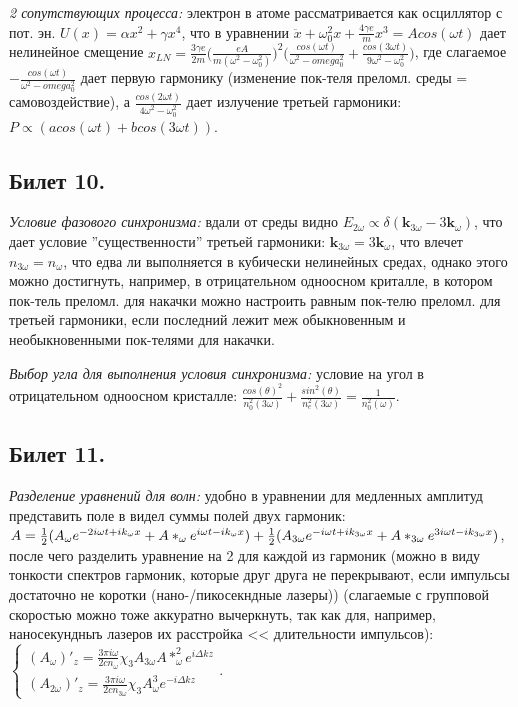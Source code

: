 \documentclass[a4paper,12pt]{article}
\theoremstyle{definition} %
\theoremstyle{definition} %
\theoremstyle{remark} %
\begin{document}
\textit{2 сопутствующих процесса:} электрон в атоме рассматривается как осциллятор с пот. эн. $U(x)=\alpha x^{2} + \gamma x^{4}$, что в уравнении $\ddot{x} + \omega_{0}^{2} x + \frac{4\gamma e}{m} x^{3} = Acos(\omega t)$ дает нелинейное смещение $x_{LN} = \frac{3\gamma e}{2m} \Big( \frac{eA}{m(\omega^{2}-\omega_{0}^{2})} \Big)^{2} \Big( \frac{cos(\omega t)}{\omega^{2}-omega_{0}^{2}} + \frac{cos(3\omega t)}{9\omega^{2}-\omega_{0}^{2}} \Big)$, где слагаемое $-\frac{cos(\omega t)}{\omega^{2}-omega_{0}^{2}}$ дает первую гармонику (изменение пок-теля преломл. среды = самовоздействие), а $\frac{cos(2\omega t)}{4\omega^{2}-\omega_{0}^{2}}$ дает излучение третьей гармоники: $P \propto (acos(\omega t)+bcos(3\omega t))$.


\subsection{Билет 10.}


\textit{Условие фазового синхронизма:} вдали от среды видно $E_{2\omega} \propto \delta(\mathbf{k}_{3\omega}-3\mathbf{k}_{\omega})$, что дает условие ''существенности'' третьей гармоники: $\mathbf{k}_{3\omega}=3\mathbf{k}_{\omega}$, что влечет $n_{3\omega}=n_{\omega}$, что едва ли выполняется в кубически нелинейных средах, однако этого можно достигнуть, например, в отрицательном одноосном криталле, в котором пок-тель преломл. для накачки можно настроить равным пок-телю преломл. для третьей гармоники, если последний лежит меж обыкновенным и необыкновенными пок-телями для накачки.


\textit{Выбор угла для выполнения условия синхронизма:} условие на угол в отрицательном одноосном кристалле: $\frac{cos(\theta)^{2}}{n_{0}^{2}(3\omega)} + \frac{sin^{2}(\theta)}{n_{e}^{2}(3\omega)} = \frac{1}{n_{0}^{2}(\omega)}$.


\subsection{Билет 11.}


\textit{Разделение уравнений для волн:} удобно в уравнении для медленных амплитуд представить поле в видел суммы полей двух гармоник: $A = \frac{1}{2} (A_{\omega}e^{-2i\omega t +i k_{\omega}x} + A*_{\omega}e^{i\omega t -i k_{\omega}x}) + \\ \frac{1}{2} (A_{3\omega}e^{-i\omega t +i k_{3\omega}x} + A*_{3\omega}e^{3i\omega t -i k_{3\omega}x})$, после чего разделить уравнение на 2 для каждой из гармоник (можно в виду тонкости спектров гармоник, которые друг друга не перекрывают, если импульсы достаточно не коротки (нано-/пикосекндные лазеры)) (слагаемые с групповой скоростью можно тоже аккуратно вычеркнуть, так как для, например, наносекундныъ лазеров их расстройка << длительности импульсов): $
	\begin{cases}
		(A_{\omega})'_{z}=\frac{3\pi i \omega}{2cn_{\omega}} \chi_{3} A_{3\omega}A*_{\omega}^{2} e^{i \Delta k z} \\
		(A_{2\omega})'_{z}=\frac{3\pi i \omega}{2cn_{3\omega}} \chi_{3} A_{\omega}^{3} e^{- i \Delta k z} 
	\end{cases}$.
\end{document}
